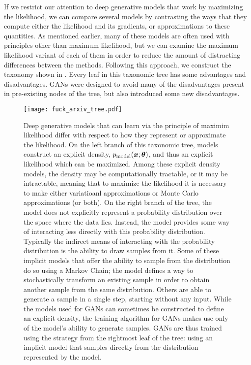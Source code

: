 If we restrict our attention to deep generative models that work by maximizing
the likelihood, we can compare several models by contrasting the ways that they
compute either the likelihood and its gradients, or approximations to these
quantities.
As mentioned earlier, many of these models are often used with principles other
than maximum likelihood, but we can examine the maximum likelihood variant of
each of them in order to reduce the amount of distracting differences between
the methods.
Following this approach, we construct the taxonomy shown in .
Every leaf in this taxonomic tree has some advantages and disadvantages.
GANs were designed to avoid many of the disadvantages present in pre-existing
nodes of the tree, but also introduced some new disadvantages.

\begin{figure}
\centering
\texttt{[image: fuck\_arxiv\_tree.pdf]}
\caption{
Deep generative models that can learn via the principle of maximim likelihood
differ with respect to how they represent or approximate the likelihood.
On the left branch of this taxonomic tree, models construct an explicit density,
$p_{\rm{model}}({\bm{x}}; {\bm{\theta}})$, and thus an explicit likelihood which can be maximized.
Among these explicit density models, the density may be computationally tractable,
or it may be intractable, meaning that to maximize the likelihood it is necessary
to make either variatioanl approximations or Monte
Carlo approximations (or both).
On the right branch of the tree, the model does not explicitly represent a
probability distribution over the space where the data lies.
Instead, the model provides some way of interacting less directly with this
probability distribution.
Typically the indirect means of interacting with the probability distribution is
the ability to draw samples from it.
Some of these implicit models that offer the ability to sample from the distribution
do so using a Markov Chain; the model defines a way to stochastically transform
an existing sample in order to obtain another sample from the same distribution.
Others are able to generate a sample in a single step, starting without any input.
While the models used for GANs can sometimes be constructed to define an explicit
density, the training algorithm for GANs makes use only of the model's ability to
generate samples.
GANs are thus trained using the strategy from the rightmost leaf of the tree:
using an implicit model that samples directly from the distribution represented
by the model.
}
\label{fig:tree}
\end{figure}

